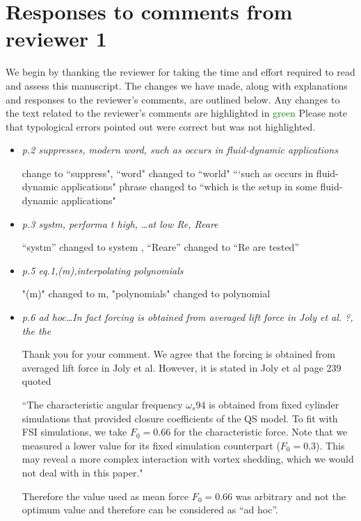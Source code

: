 \documentclass[]{article}
\begin{document}
\section*{Responses to comments from reviewer 1}

We begin by thanking the reviewer for taking the time and effort
required to read and assess this manuscript. The changes we have made, along with explanations and
responses to the reviewer's comments, are outlined below. Any changes to the text related to the reviewer's comments are highlighted in
\textcolor{green}{green} Please note that typological errors pointed out were correct but was not highlighted.

\begin{itemize}
\item \emph{p.2	suppresses,	modern word, such as occurs in fluid-dynamic applications}

change to ``suppress", ``word" changed to ``world" ```such as occurs in fluid-dynamic applications" phrase changed to ``which is the setup in some fluid-dynamic applications"

\item \emph{p.3	systm,	performa	t high,	…at	low	Re,	Reare}

“systm” changed to system , “Reare” changed to “Re are tested”  

\item \emph{p.5	eq.1,(m),interpolating polynomials}

"(m)" changed to m, "polynomials" changed to polynomial

\item \emph{p.6	ad hoc…In fact forcing is obtained from	averaged lift force	in Joly et al. ?, the the}

Thank you for your comment. We agree that the forcing is obtained from averaged lift force in Joly et al. However, it is stated in Joly et al  page 239 quoted 

``The characteristic angular frequency $\omega_{s}94$ is obtained from fixed cylinder simulations that provided closure coefficients of the QS model. To fit with FSI simulations, we take $F_0=0.66$ for the characteristic force. Note that we measured a lower value for its fixed simulation counterpart ($F_0=0.3$). This may reveal a more complex interaction with vortex shedding, which we would not deal with in this paper."

Therefore the value used as mean force $F_0= 0.66$ was arbitrary and not the optimum value and therefore can be considered as “ad hoc”.


\end{itemize}
\end{document}

